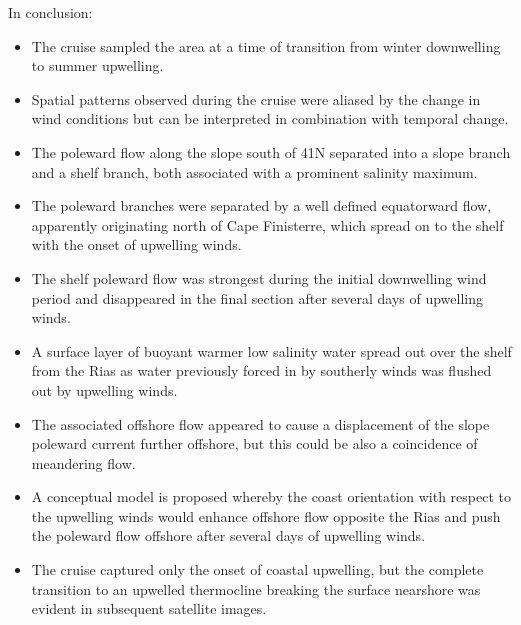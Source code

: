 In conclusion:
\begin{itemize}
\item The cruise sampled the area at a time of transition from
winter downwelling to summer upwelling.
\item Spatial patterns observed during the cruise were aliased by
the change in wind conditions but can be interpreted in
combination with temporal change.
\item The poleward flow along the slope south of 41\deg N
separated into a slope branch and a shelf branch, both associated
with a prominent salinity maximum.
\item The poleward branches were separated by a well defined
equatorward flow, apparently originating north of Cape Finisterre,
which spread on to the shelf with the onset of upwelling winds.
\item The shelf poleward flow was strongest during the initial
downwelling wind period and disappeared in the final section after
several days of upwelling winds.
\item A surface layer of buoyant warmer low salinity water spread
out over the shelf from the Rias as water previously forced in by
southerly winds was flushed out by upwelling winds.
\item The associated offshore flow appeared to cause a
displacement of the slope poleward current further offshore, but
this could be also a coincidence of meandering flow.
\item A conceptual model is proposed whereby the coast orientation
with respect to the upwelling winds would enhance offshore flow
opposite the Rias and push the poleward flow offshore after
several days of upwelling winds.
\item The cruise captured only the onset of coastal upwelling, but
the complete transition to an upwelled thermocline breaking the
surface nearshore was evident in subsequent satellite images.
\end{itemize}
